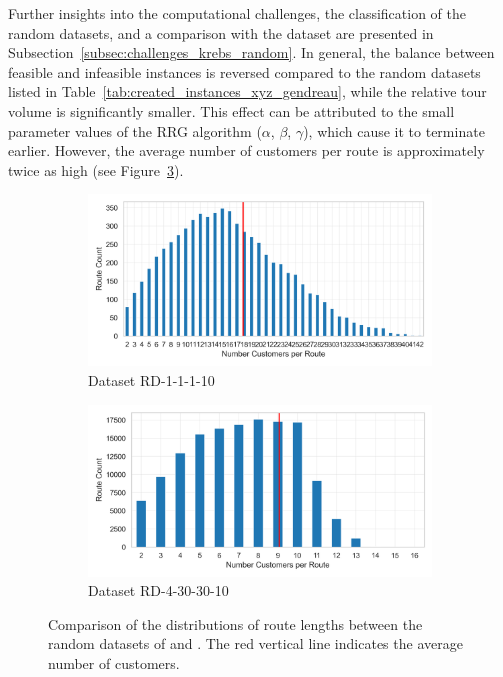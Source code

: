 Further insights into the computational challenges, the classification of the random datasets, and a comparison with the
\gendreauDataSetText dataset are presented in Subsection~\ref{subsec:challenges_krebs_random}. In general, the balance between
feasible and infeasible instances is reversed compared to the random datasets listed in Table~\ref{tab:created_instances_xyz_gendreau},
while the relative tour volume is significantly smaller. This effect can be attributed to the small parameter values of the \gls{RRG}
algorithm ($\alpha$, $\beta$, $\gamma$), which cause it to terminate earlier. However, the average number of customers per route
is approximately twice as high (see Figure~\ref{fig:route_cust_no_krebs_new}).

\begin{figure}[ht]
    \centering
    \begin{subfigure}[t]{.5\textwidth}
        \centering
        \includegraphics[width=\linewidth]{pictures/dataset_structure/no_cust_plot_RandomData_1_1_1_10.png}
        \caption{Dataset RD-1-1-1-10}
        \label{fig:ds-a-krebs_lop}
    \end{subfigure}%
    \begin{subfigure}[t]{.5\textwidth}
        \centering
        \includegraphics[width=\linewidth]{pictures/dataset_structure/no_cust_plot_RandomData_4_30_30_10.png}
        \caption{Dataset RD-4-30-30-10}
        \label{fig:ds-b-krebs_luf}
    \end{subfigure}
    \caption[Comparison of the distributions of route lengths between the random datasets of \krebsADataSetText and \gendreauDataSet.]
    {Comparison of the distributions of route lengths between the random datasets of \krebsADataSetText and \gendreauDataSet. The red vertical line indicates the average number of customers.}
    \label{fig:route_cust_no_krebs_new}
\end{figure}

